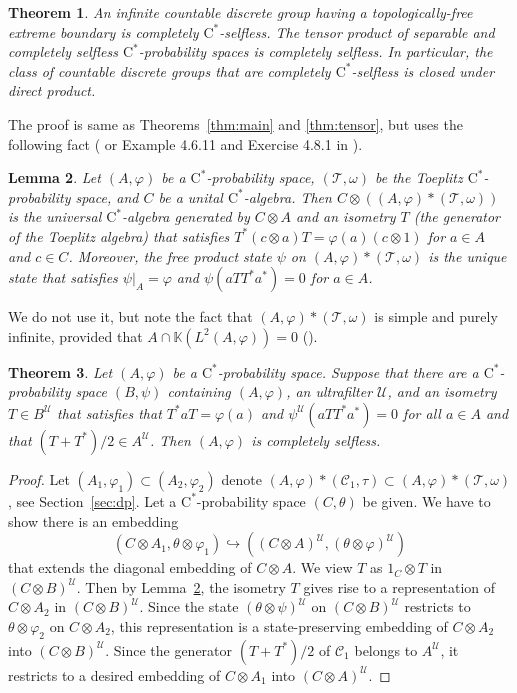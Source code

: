 \documentclass[12pt,nosumlimits,nonamelimits]{amsart}
\newtheorem{thm}{Theorem}
\newtheorem{lem}[thm]{Lemma}
\theoremstyle{remark}
\theoremstyle{definition}
\newcommand{\IK}{\mathbb{K}}
\newcommand{\cC}{\mathcal{C}}
\newcommand{\cT}{\mathcal{T}}
\newcommand{\cU}{\mathcal{U}}
\newcommand{\vp}{\varphi}
\begin{document}
\begin{thm}
An infinite countable discrete group having 
a topologically-free extreme boundary is completely 
$\mathrm{C}^*$-selfless. 
The tensor product of separable and completely selfless 
$\mathrm{C}^*$-prob\-a\-bility spaces is completely selfless. 
In particular, the class of countable discrete groups that 
are completely $\mathrm{C}^*$-selfless is closed under 
direct product.
\end{thm}

The proof is same as Theorems~\ref{thm:main} 
and \ref{thm:tensor}, but uses the following fact 
(\cite{shlyakhtenko} or 
Example 4.6.11 and Exercise 4.8.1 in \cite{bo}).

\begin{lem}\label{lem:toeplitz}
Let $(A,\vp)$ be a $\mathrm{C}^*$-prob\-a\-bility space, 
$(\cT,\omega)$ be the Toeplitz $\mathrm{C}^*$-prob\-a\-bility space, 
and $C$ be a unital $\mathrm{C}^*$-alge\-bra. 
Then $C\otimes ((A,\vp)\ast(\cT,\omega))$ is 
the universal $\mathrm{C}^*$-alge\-bra generated by 
$C\otimes A$ and an isometry $T$ 
(the generator of the Toeplitz algebra) that satisfies 
$T^*(c\otimes a)T=\vp(a)(c\otimes1)$ for $a\in A$ and $c\in C$. 
Moreover, the free product state $\psi$ on $(A,\vp)\ast(\cT,\omega)$ 
is the unique state that satisfies $\psi|_A=\vp$ and $\psi(aTT^*a^*)=0$ for $a\in A$.
\end{lem}
%
%

We do not use it, but note the fact that 
$(A,\vp)\ast(\cT,\omega)$ is 
simple and purely infinite, provided that
$A \cap \IK(L^2(A,\vp))=0$ (\cite{kumjian}). 

\begin{thm}\label{thm:toeplitz}
Let $(A,\vp)$ be a $\mathrm{C}^*$-prob\-a\-bility space. 
Suppose that there are a $\mathrm{C}^*$-prob\-a\-bility 
space $(B,\psi)$ containing $(A,\vp)$, an ultrafilter $\cU$, 
and an isometry $T\in B^\cU$ that satisfies that 
$T^*aT=\vp(a)$ and $\psi^\cU(aTT^*a^*)=0$ for all $a\in A$ and 
that $(T+T^*)/2 \in A^\cU$. 
Then $(A,\vp)$ is completely selfless. 
\end{thm}
\begin{proof}
Let $(A_1,\vp_1) \subset (A_2,\vp_2)$ 
denote $(A,\vp)*(\cC_1,\tau)\subset (A,\vp)*(\cT,\omega)$, 
see Section~\ref{sec:dp}.
Let a $\mathrm{C}^*$-prob\-a\-bility space $(C,\theta)$ be given. 
We have to show there is an embedding 
\[
(C\otimes A_1,\theta\otimes\vp_1)
 \hookrightarrow((C\otimes A)^\cU,(\theta\otimes\vp)^\cU)
\] 
that extends the diagonal embedding of $C\otimes A$.
We view $T$ as $1_C\otimes T$ in $(C\otimes B)^\cU$.
Then by Lemma~\ref{lem:toeplitz}, the isometry $T$ gives rise to 
a representation of $C\otimes A_2$ in $(C\otimes B)^\cU$. 
Since the state $(\theta\otimes\psi)^\cU$ on $(C\otimes B)^\cU$ 
restricts to $\theta\otimes\vp_2$ on $C\otimes A_2$, 
this representation is a state-preserving embedding of 
$C\otimes A_2$ into $(C\otimes B)^\cU$. 
Since the generator $(T+T^*)/2$ of $\cC_1$ belongs to $A^\cU$, 
it restricts to a desired embedding of $C\otimes A_1$ into $(C\otimes A)^\cU$.
\end{proof}
\end{document}
